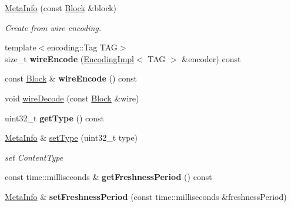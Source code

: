 \begin{DoxyCompactItemize}
\item 
\hyperlink{classndn_1_1MetaInfo_ae27aba59adaf71130809d705be43fb8b}{Meta\+Info} (const \hyperlink{classndn_1_1Block}{Block} \&block)\hypertarget{classndn_1_1MetaInfo_ae27aba59adaf71130809d705be43fb8b}{}\label{classndn_1_1MetaInfo_ae27aba59adaf71130809d705be43fb8b}

\begin{DoxyCompactList}\small\item\em Create from wire encoding. \end{DoxyCompactList}\item 
{\footnotesize template$<$encoding\+::\+Tag T\+AG$>$ }\\size\+\_\+t {\bfseries wire\+Encode} (\hyperlink{classndn_1_1encoding_1_1EncodingImpl}{Encoding\+Impl}$<$ T\+AG $>$ \&encoder) const\hypertarget{classndn_1_1MetaInfo_ac046b0042190a5366a28bd8e0f15b549}{}\label{classndn_1_1MetaInfo_ac046b0042190a5366a28bd8e0f15b549}

\item 
const \hyperlink{classndn_1_1Block}{Block} \& {\bfseries wire\+Encode} () const\hypertarget{classndn_1_1MetaInfo_a9a8ed0a3bba525f0a333ebba074c24d2}{}\label{classndn_1_1MetaInfo_a9a8ed0a3bba525f0a333ebba074c24d2}

\item 
void \hyperlink{classndn_1_1MetaInfo_a17dc52b30e227d97f3e31394c013c1fa}{wire\+Decode} (const \hyperlink{classndn_1_1Block}{Block} \&wire)
\item 
uint32\+\_\+t {\bfseries get\+Type} () const\hypertarget{classndn_1_1MetaInfo_ad77be09078e54f9ed5ecdbacdb1d97ab}{}\label{classndn_1_1MetaInfo_ad77be09078e54f9ed5ecdbacdb1d97ab}

\item 
\hyperlink{classndn_1_1MetaInfo}{Meta\+Info} \& \hyperlink{classndn_1_1MetaInfo_a6df94440a24ff6778d2d8bc2a13816e9}{set\+Type} (uint32\+\_\+t type)
\begin{DoxyCompactList}\small\item\em set Content\+Type \end{DoxyCompactList}\item 
const time\+::milliseconds \& {\bfseries get\+Freshness\+Period} () const\hypertarget{classndn_1_1MetaInfo_adc93e8e49551fc10eb439923d4c7a712}{}\label{classndn_1_1MetaInfo_adc93e8e49551fc10eb439923d4c7a712}

\item 
\hyperlink{classndn_1_1MetaInfo}{Meta\+Info} \& {\bfseries set\+Freshness\+Period} (const time\+::milliseconds \&freshness\+Period)\hypertarget{classndn_1_1MetaInfo_a700ea635f94fb8ec1e0f0b09a72b65eb}{}\label{classndn_1_1MetaInfo_a700ea635f94fb8ec1e0f0b09a72b65eb}


\end{DoxyCompactItemize}
